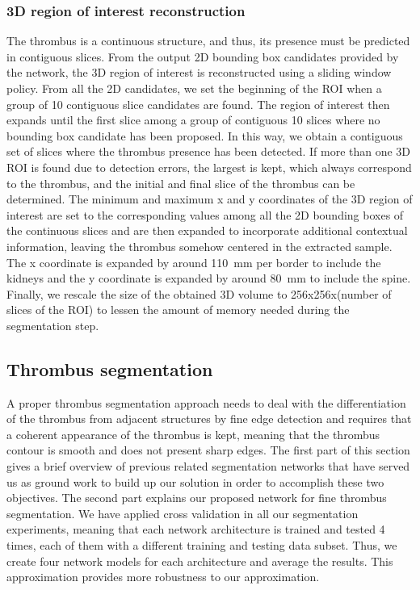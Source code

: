 \documentclass[preprint,authoryear,12pt]{elsarticle}
\begin{document}
\subsubsection{3D region of interest reconstruction}
The thrombus is a continuous structure, and thus, its presence must be predicted in contiguous slices. From the output 2D bounding box candidates provided by the network, the 3D region of interest is reconstructed using a sliding window policy. From all the 2D candidates, we set the beginning of the ROI when a group of 10 contiguous slice candidates are found. The region of interest then expands until the first slice among a group of contiguous 10 slices where no bounding box candidate has been proposed. In this way, we obtain a contiguous set of slices where the thrombus presence has been detected. If more than one 3D ROI is found due to detection errors, the largest is kept, which always correspond to the thrombus, and the initial and final slice of the thrombus can be determined. The minimum and maximum x and y coordinates of the 3D region of interest are set to the corresponding values among all the 2D bounding boxes of the continuous slices and are then expanded %
to incorporate additional contextual information, leaving the thrombus somehow centered in the extracted sample. The x coordinate is expanded by around 110~mm per border to include the kidneys and the y coordinate is expanded by around 80~mm to include the spine. Finally, we rescale the size of the obtained 3D volume to 256x256x(number of slices of the ROI) to lessen the amount of memory needed during the segmentation step.   


\subsection{Thrombus segmentation}
A proper thrombus segmentation approach needs to deal with the differentiation of the thrombus from adjacent structures by fine edge detection and requires that a coherent appearance of the thrombus is kept, meaning that the thrombus contour is smooth and does not present sharp edges. The first part of this section gives a brief overview of previous related segmentation networks that have served us as ground work to build up our solution in order to accomplish these two objectives.
The second part explains our proposed network for fine thrombus segmentation. We have applied cross validation in all our segmentation experiments, meaning that each network architecture is trained and tested 4 times, each of them with a different training and testing data subset. Thus, we create four network models for each architecture and average the results. This approximation provides more robustness to our approximation.
 
\end{document}
